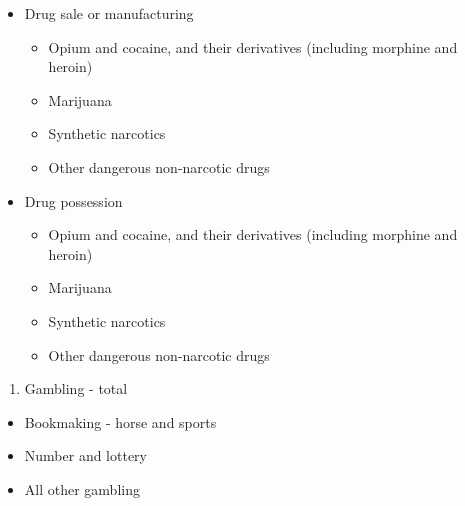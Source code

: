 \documentclass[
  12pt,
  openany]{book}
\providecommand{\tightlist}{%
  \setlength{\itemsep}{0pt}\setlength{\parskip}{0pt}}
\begin{document}
\begin{itemize}
\tightlist
\item
  Drug sale or manufacturing

  \begin{itemize}
  \tightlist
  \item
    Opium and cocaine, and their derivatives (including morphine and heroin)
  \item
    Marijuana
  \item
    Synthetic narcotics
  \item
    Other dangerous non-narcotic drugs
  \end{itemize}
\item
  Drug possession

  \begin{itemize}
  \tightlist
  \item
    Opium and cocaine, and their derivatives (including morphine and heroin)
  \item
    Marijuana
  \item
    Synthetic narcotics
  \item
    Other dangerous non-narcotic drugs
  \end{itemize}
\end{itemize}

\begin{enumerate}
\def\labelenumi{\arabic{enumi}.}
\setcounter{enumi}{18}
\tightlist
\item
  Gambling - total
\end{enumerate}

\begin{itemize}
\tightlist
\item
  Bookmaking - horse and sports
\item
  Number and lottery
\item
  All other gambling
\end{itemize}
\end{document}
